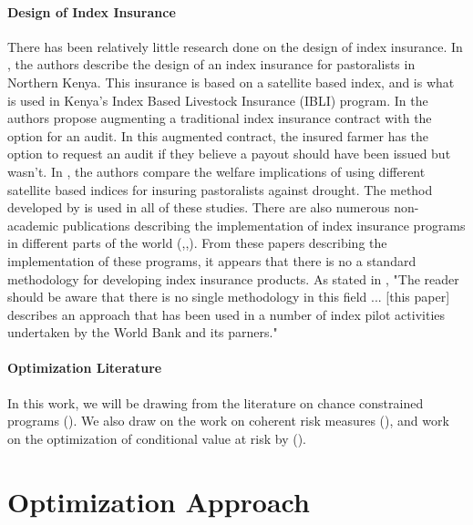 \documentclass[11pt]{article}
\begin{document}
\paragraph{Design of Index Insurance} There has been relatively little research done on the design of index insurance. In \cite{chantarat2013designing}, the authors describe the design of an index insurance for pastoralists in Northern Kenya. This insurance is based on a satellite based index, and is what is used in Kenya's Index Based Livestock Insurance (IBLI) program. In \cite{flatnes2018improving} the authors propose augmenting a traditional index insurance contract with the option for an audit. In this augmented contract, the insured farmer has the option to request an audit if they believe a payout should have been issued but wasn't. In \cite{jensen2019does}, the authors compare the welfare implications of using different satellite based indices for insuring pastoralists against drought. The method developed by \cite{chantarat2013designing} is used in all of these studies. There are also numerous non-academic publications describing the implementation of index insurance programs in different parts of the world (\cite{osgood2007designing},\cite{world2011weather},\cite{greatrex2015scaling}). From these papers describing the implementation of these programs, it appears that there is no a standard methodology for developing index insurance products. As stated in \cite{world2011weather}, "The reader should be aware that there is no single methodology in this field ... [this paper] describes an approach that has been used in a number of index pilot activities undertaken by the World Bank and its parners." 

\paragraph{Optimization Literature} In this work, we will be drawing from the literature on chance constrained programs (\cite{lagoa2005probabilistically}). We also draw on the work on coherent risk measures (\cite{artzner1999coherent}), and work on the optimization of conditional value at risk by (\cite{rockafellar2000optimization}).

\section{Optimization Approach}
\end{document}
